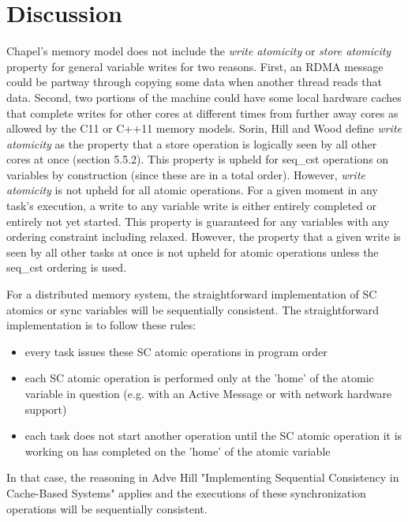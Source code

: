 \section{Discussion}

Chapel's memory model does not include the \textit{write atomicity} or
\textit{store atomicity} property for general variable writes for two reasons.
First, an RDMA message could be partway through copying some data when another
thread reads that data. Second, two portions of the machine could have some
local hardware caches that complete writes for other cores at different times
from further away cores as allowed by the C11 or C++11 memory models. Sorin,
Hill and Wood define \textit{write atomicity} as the property that a store
operation is logically seen by all other cores at once (section 5.5.2). This
property is upheld for seq\_cst operations on  variables by
construction (since these are in a total order). However, \textit{write
atomicity} is not upheld for all atomic operations. For a given moment in any
task's execution, a write to any  variable write is either
entirely completed or entirely not yet started. This property is guaranteed for
any  variables with any ordering constraint including relaxed.
However, the property that a given write is seen by all other tasks at once is
not upheld for atomic operations unless the seq\_cst ordering is used.

For a distributed memory system, the straightforward implementation of SC
atomics or sync variables will be sequentially consistent. The straightforward
implementation is to follow these rules:

\begin{itemize}

 \item every task issues these SC atomic operations in program order

 \item each SC atomic operation is performed only at the 'home' of the atomic
 variable in question (e.g. with an Active Message or with network hardware
 support)

 \item each task does not start another operation until the SC atomic operation
 it is working on has completed on the 'home' of the atomic variable

\end{itemize}

In that case, the reasoning in Adve Hill "Implementing Sequential Consistency
in Cache-Based Systems" applies and the executions of these synchronization
operations will be sequentially consistent.

